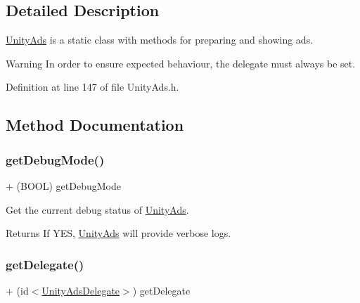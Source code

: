 \subsection{Detailed Description}
{\ttfamily \mbox{\hyperlink{interface_unity_ads}{Unity\+Ads}}} is a static class with methods for preparing and showing ads.

\begin{DoxyWarning}{Warning}
In order to ensure expected behaviour, the delegate must always be set. 
\end{DoxyWarning}


Definition at line 147 of file Unity\+Ads.\+h.



\subsection{Method Documentation}
\mbox{\label{interface_unity_ads_ad7d6aade30273f805bd0f077fd29e0c9}} 
\subsubsection{\texorpdfstring{getDebugMode()}{getDebugMode()}}
{\footnotesize\ttfamily + (B\+O\+OL) get\+Debug\+Mode \begin{DoxyParamCaption}{ }\end{DoxyParamCaption}}

Get the current debug status of {\ttfamily \mbox{\hyperlink{interface_unity_ads}{Unity\+Ads}}}.

\begin{DoxyReturn}{Returns}
If {\ttfamily Y\+ES}, {\ttfamily \mbox{\hyperlink{interface_unity_ads}{Unity\+Ads}}} will provide verbose logs. 
\end{DoxyReturn}
\mbox{\label{interface_unity_ads_a4b9aac259a3cb9906685eca5cbf5af5e}} 
\subsubsection{\texorpdfstring{getDelegate()}{getDelegate()}}
{\footnotesize\ttfamily + (id$<$\mbox{\hyperlink{protocol_unity_ads_delegate-p}{Unity\+Ads\+Delegate}}$>$) get\+Delegate \begin{DoxyParamCaption}{ }\end{DoxyParamCaption}}

